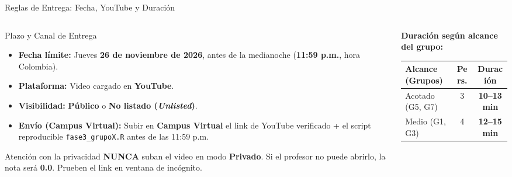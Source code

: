 \documentclass[aspectratio=169, 10pt]{beamer}
\begin{document}
\begin{frame}{Reglas de Entrega: Fecha, YouTube y Duraci\'on}
  \begin{columns}[T]
    \begin{column}{0.52\textwidth}
      \begin{block}{Plazo y Canal de Entrega}
        \small
        \begin{itemize}\setlength{\itemsep}{3pt}
          \item \textbf{Fecha l\'imite:} Jueves \textbf{26 de noviembre de 2026}, antes de la medianoche (\textbf{11:59 p.m.}, hora Colombia).
          \item \textbf{Plataforma:} Video cargado en \textbf{YouTube}.
          \item \textbf{Visibilidad:} \textbf{P\'ublico} o \textbf{No listado (\textit{Unlisted})}.
          \item \textbf{Env\'io (Campus Virtual):} Subir en \textbf{Campus Virtual} el link de YouTube verificado + el script reproducible \texttt{fase3\_grupoX.R} antes de las 11:59 p.m.
        \end{itemize}
      \end{block}
      \vspace{4pt}
      \begin{alertblock}{Atenci\'on con la privacidad}
        \footnotesize \textbf{NUNCA} suban el video en modo \textbf{Privado}. Si el profesor no puede abrirlo, la nota ser\'a \textbf{0.0}. Prueben el link en ventana de inc\'ognito.
      \end{alertblock}
    \end{column}
    \begin{column}{0.44\textwidth}
      \textbf{Duraci\'on seg\'un alcance del grupo:}
      \vspace{3pt}
      \renewcommand{\arraystretch}{1.22}
      \setlength{\tabcolsep}{4.5pt}
      \begin{center}
      \footnotesize
      \begin{tabular}{l c c}
        \toprule
        \textbf{Alcance (Grupos)} & \textbf{Pers.} & \textbf{Duraci\'on} \\
        \midrule
        Acotado (G5, G7) & 3 & \textbf{10--13 min} \\
        Medio (G1, G3) & 4 & \textbf{12--15 min} \\

\end{tabular}
\end{center}
\end{column}
\end{columns}
\end{frame}
\end{document}
